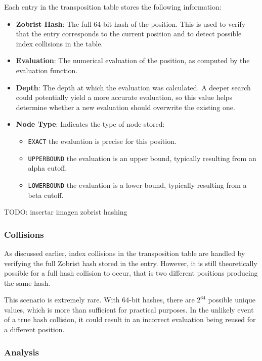 Each entry in the transposition table stores the following information:

\begin{itemize}
  \item \textbf{Zobrist Hash}: The full 64-bit hash of the position. This is used to verify that the entry corresponds to the current position and to detect possible index collisions in the table.
  \item \textbf{Evaluation}: The numerical evaluation of the position, as computed by the evaluation function.
  \item \textbf{Depth}: The depth at which the evaluation was calculated. A deeper search could potentially yield a more accurate evaluation, so this value helps determine whether a new evaluation should overwrite the existing one.
  \item \textbf{Node Type}: Indicates the type of node stored:
  \begin{itemize}
    \item \texttt{EXACT} the evaluation is precise for this position.
    \item \texttt{UPPERBOUND} the evaluation is an upper bound, typically resulting from an alpha cutoff.
    \item \texttt{LOWERBOUND} the evaluation is a lower bound, typically resulting from a beta cutoff.
  \end{itemize}
\end{itemize}

TODO: insertar imagen zobrist hashing

\subsubsection{Collisions}

As discussed earlier, index collisions in the transposition table are handled by verifying the full Zobrist hash stored in the entry. However, it is still theoretically possible for a full hash collision to occur, that is two different positions producing the same hash.

\noindent This scenario is extremely rare. With 64-bit hashes, there are $2^{64}$ possible unique values, which is more than sufficient for practical purposes. In the unlikely event of a true hash collision, it could result in an incorrect evaluation being reused for a different position.

\subsubsection{Analysis}

